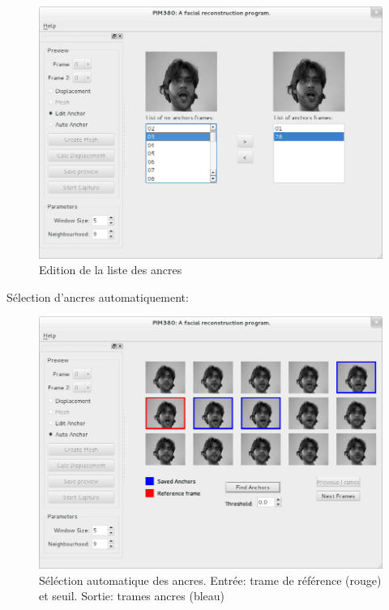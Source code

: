 \documentclass[a4paper,11pt]{article}
\begin{document}
\begin{figure}[h!]
  \begin{center}
    \includegraphics[scale=0.4]{img/editAnchorList.png}
    \caption{Edition de la liste des ancres}
  \end{center}
\end{figure}

Sélection d'ancres automatiquement:

\begin{figure}[h!]
  \begin{center}
    \includegraphics[scale=0.4]{img/AnchorAutomaticSelection.png}
    \caption{Séléction automatique des ancres. Entrée: trame de référence (rouge) et seuil. Sortie: trames ancres (bleau)}
  \end{center}
\end{figure}
\end{document}
